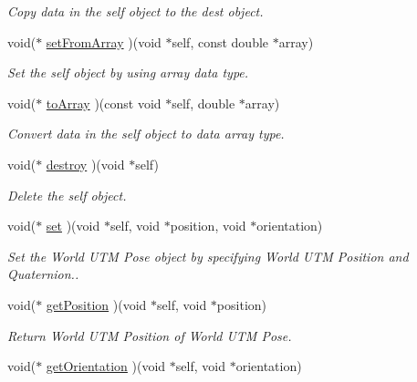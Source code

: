 \begin{CompactItemize}
\begin{CompactList}\small\item\em Copy data in the self object to the dest object. \item\end{CompactList}\item 
void($\ast$ \hyperlink{structdrdc__WUTMPose__t_f75ed59f418f9115176b27bddc12b14e}{setFromArray} )(void $\ast$self, const double $\ast$array)
\begin{CompactList}\small\item\em Set the self object by using array data type. \item\end{CompactList}\item 
void($\ast$ \hyperlink{structdrdc__WUTMPose__t_9f10e14e23df81e7cdab8cd7ec81969c}{toArray} )(const void $\ast$self, double $\ast$array)
\begin{CompactList}\small\item\em Convert data in the self object to data array type. \item\end{CompactList}\item 
void($\ast$ \hyperlink{structdrdc__WUTMPose__t_ae4fd2fd1d355dfbdc6c3fff7c4859fe}{destroy} )(void $\ast$self)
\begin{CompactList}\small\item\em Delete the self object. \item\end{CompactList}\item 
void($\ast$ \hyperlink{structdrdc__WUTMPose__t_3f4c484b88cbd7ffcfc65f52f39c43b8}{set} )(void $\ast$self, void $\ast$position, void $\ast$orientation)
\begin{CompactList}\small\item\em Set the World UTM Pose object by specifying World UTM Position and Quaternion.. \item\end{CompactList}\item 
void($\ast$ \hyperlink{structdrdc__WUTMPose__t_93bd3f174f9a41aac4503486bff58c46}{getPosition} )(void $\ast$self, void $\ast$position)
\begin{CompactList}\small\item\em Return World UTM Position of World UTM Pose. \item\end{CompactList}\item 
void($\ast$ \hyperlink{structdrdc__WUTMPose__t_932663f57244d6db21db5e0966109373}{getOrientation} )(void $\ast$self, void $\ast$orientation)

\end{CompactItemize}
